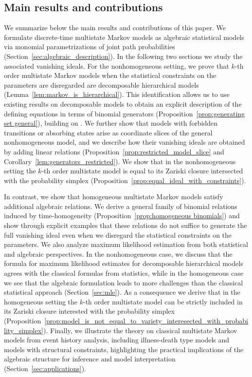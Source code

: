 \documentclass[11pt, a4paper]{article}
\numberwithin{equation}{section}
\theoremstyle{plain}
\theoremstyle{definition}
\begin{document}
\subsection{Main results and contributions}

We summarize below the main results and contributions of this paper.
We formulate discrete-time multistate Markov models as algebraic statistical models via monomial
parametrizations of joint path probabilities
(Section~\ref{sec:algebraic_description}). In the following two sections we study the associated vanishing ideals. For the nonhomogeneous setting, we prove that $k$-th order multistate Markov models when the statistical constraints on the parameters are disregarded
are decomposable hierarchical models (Lemma~\ref{lem:markov_is_hierarchical}). This identification
allows us to use existing results on decomposable models to obtain an explicit description
of the defining equations in terms of binomial generators
(Proposition~\ref{prop:generating set general}), building on
\cite{dobra2003markov,diaconis1998algebraic}. We further show that models
with forbidden transitions or absorbing states arise as coordinate slices of the general
nonhomogeneous model, and we describe how their vanishing ideals are obtained by adding linear
relations (Proposition~\ref{prop:restricted_model_slice} and
Corollary~\ref{lem:generators_restricted}). We show that in the nonhomogeneous setting the $k$-th order multistate model is equal to its Zariski closure intersected with the probability simplex (Proposition~\ref{prop:equal_ideal_with_constraints}). 

In contrast, we show that homogeneous multistate Markov models satisfy additional algebraic
relations. 
We derive a general family of binomial
relations induced by time-homogeneity (Proposition~\ref{prop:homogeneous binomials}) and show
through explicit examples that these relations do not suffice to generate the full vanishing
ideal even when we disregard the statistical constraints on the parameters. We also analyze maximum likelihood estimation from both statistical and algebraic
perspectives. In the nonhomogeneous case, we discuss that the formula for maximum likelihood estimates for decomposable hierarchical models agrees with the classical formulas from statistics, while in the homogeneous case we see that the algebraic formulation leads to more challenges than the
classical statistical approach (Section~\ref{sec:mle}). As a consequence we derive that in the homogeneous setting the $k$-th order multistate model can be strictly included in its Zariski closure interested with the probability simplex (Proposition~\ref{prop:model_is_not_equal_to_variety_interesected_with_probability_simplex}). 
Finally, we illustrate the theory on classical multistate Markov models from event history analysis,
including illness-death type models and models with structural constraints, highlighting the
practical implications of the algebraic structure for inference and model interpretation
(Section~\ref{sec:applications}).
\end{document}
